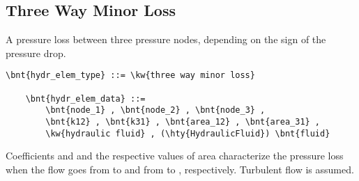 \subsection{Three Way Minor Loss}
A pressure loss between three pressure nodes,
depending on the sign of the pressure drop.
\label{sec:EL:HYDR:THREE_WAY_MINOR_LOSS}
\begin{Verbatim}[commandchars=\\\{\}]
    \bnt{hydr_elem_type} ::= \kw{three way minor loss}

    \bnt{hydr_elem_data} ::=
        \bnt{node_1} , \bnt{node_2} , \bnt{node_3} ,
        \bnt{k12} , \bnt{k31} , \bnt{area_12} , \bnt{area_31} ,
        \kw{hydraulic fluid} , (\hty{HydraulicFluid}) \bnt{fluid}
\end{Verbatim}
Coefficients  and  and the respective values of area
characterize the pressure loss when the flow goes
from  to  and from  to ,
respectively.
Turbulent flow is assumed.




